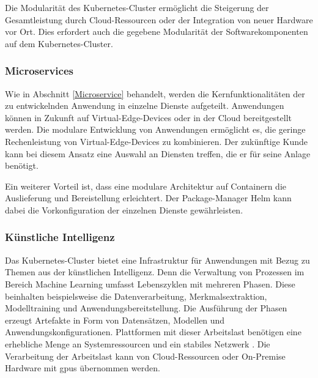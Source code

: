 Die Modularität des Kubernetes-Cluster ermöglicht die Steigerung der Gesamtleistung durch Cloud-Ressourcen oder der Integration von neuer Hardware vor Ort.
Dies erfordert auch die gegebene Modularität der Softwarekomponenten auf dem Kubernetes-Cluster.

\subsubsection{Microservices}
Wie in Abschnitt \ref{Microservice} behandelt, werden die Kernfunktionalitäten der zu entwickelnden Anwendung in einzelne Dienste aufgeteilt.
Anwendungen können in Zukunft auf Virtual-Edge-Devices oder in der Cloud bereitgestellt werden.
Die modulare Entwicklung von Anwendungen ermöglicht es, die geringe Rechenleistung von Virtual-Edge-Devices zu kombinieren.
Der zukünftige Kunde kann bei diesem Ansatz eine Auswahl an Diensten treffen, die er für seine Anlage benötigt.

Ein weiterer Vorteil ist, dass eine modulare Architektur auf Containern die Auslieferung und Bereistellung erleichtert.
Der Package-Manager Helm kann dabei die Vorkonfiguration der einzelnen Dienste gewährleisten.


\subsubsection{Künstliche Intelligenz}
Das Kubernetes-Cluster bietet eine Infrastruktur für Anwendungen mit Bezug zu Themen aus der künstlichen Intelligenz.
Denn die Verwaltung von Prozessen im Bereich Machine Learning umfasst Lebenszyklen mit mehreren Phasen.
Diese beinhalten beispielsweise die Datenverarbeitung, Merkmalsextraktion, Modelltraining und Anwendungsbereitstellung.
Die Ausführung der Phasen erzeugt Artefakte in Form von Datensätzen, Modellen und Anwendungskonfigurationen.
Plattformen mit dieser Arbeitslast benötigen eine erhebliche Menge an Systemressourcen und ein stabiles Netzwerk \cite{mlops}.
Die Verarbeitung der Arbeitslast kann von Cloud-Ressourcen oder On-Premise Hardware mit \acp{gpu} übernommen werden.
